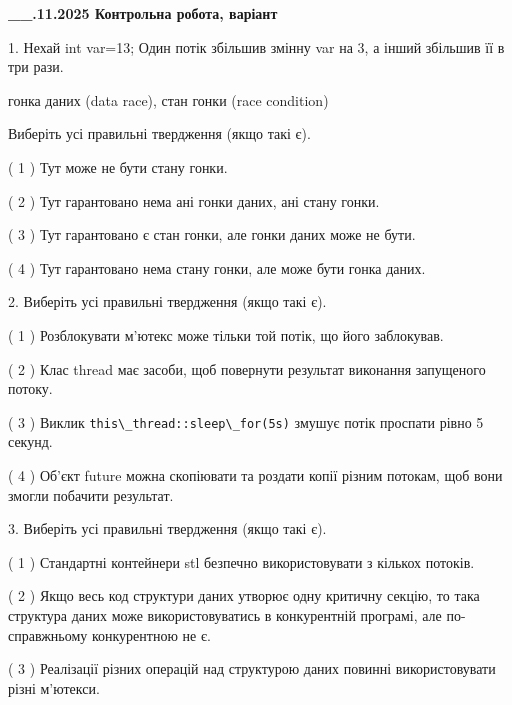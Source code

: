 \documentclass[12pt, ukrainian]{article}
\def\code#1{\Verb!#1!}
\begin{document}
\newpage
\begin {large}

\textbf{\_\_.11.2025 Контрольна робота, варіант  }\par


{
1. Нехай int var=13; Один потік збільшив змінну var на 3, а інший збільшив її в три рази.

гонка даних (data race), стан гонки (race condition)

Виберіть усі правильні твердження (якщо такі є).\par
\vspace{2mm}
( 1 ) Тут може не бути стану гонки.%

( 2 ) Тут гарантовано нема ані гонки даних, ані стану гонки.%

( 3 ) Тут гарантовано є стан гонки, але гонки даних може не бути.%

( 4 ) Тут гарантовано нема стану гонки, але може бути гонка даних.%


2. Виберіть усі правильні твердження (якщо такі є).\par
\vspace{2mm}

( 1 ) Розблокувати м’ютекс може тільки той потік, що його заблокував.%

( 2 ) Клас thread має засоби, щоб повернути результат виконання запущеного потоку.%

( 3 ) Виклик \code{this\_thread::sleep\_for(5s)} змушує потік проспати рівно 5 секунд.%

( 4 ) Об’єкт future можна скопіювати та роздати копії різним потокам, щоб вони змогли побачити результат.%


3. Виберіть усі правильні твердження (якщо такі є).\par
\vspace{2mm}

( 1 ) Стандартні контейнери stl безпечно використовувати з кількох потоків.%

( 2 ) Якщо весь код структури даних утворює одну критичну секцію, то така структура даних може використовуватись в конкурентній програмі, але по-справжньо\-му конкурентною не є.%

( 3 ) Реалізації різних операцій над структурою даних повинні використовувати різні м’ютекси.%

}
\end{large}
\end{document}
